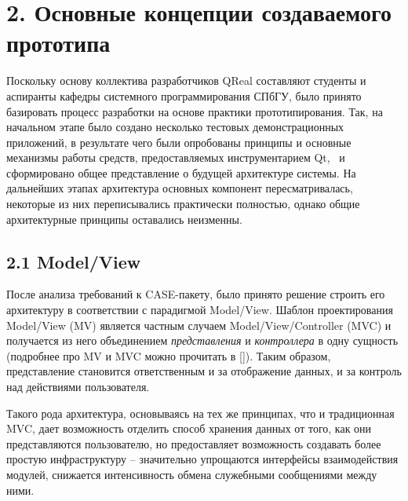 \documentclass[a4paper]{article}
\begin{document}
\bigskip

\section{2. Основные концепции создаваемого прототипа}
{
Поскольку основу коллектива разработчиков
\foreignlanguage{english}{QReal} составляют студенты и аспиранты
кафедры системного программирования СПбГУ, было принято базировать
процесс разработки на основе практики прототипирования. Так, на
начальном этапе было создано несколько тестовых демонстрационных
приложений, в результате чего были опробованы принципы и основные
механизмы работы средств, предоставляемых инструментарием Qt, \ и
сформировано общее представление о будущей архитектуре системы. На
дальнейших этапах архитектура основных компонент пересматривалась,
некоторые из них переписывались практически полностью, однако общие
архитектурные принципы оставались неизменны. }


\bigskip

\subsection[2.1 Model/View ]{ 2.1 Model/View }
{
После анализа требований к \foreignlanguage{english}{CASE}{}-пакету,
было принято решение строить его архитектуру в соответствии с
парадигмой
\foreignlanguage{english}{Model}/\foreignlanguage{english}{View}.
Шаблон проектирования
\foreignlanguage{english}{Model}/\foreignlanguage{english}{View}
(\foreignlanguage{english}{MV}) является частным случаем
\foreignlanguage{english}{Model}/\foreignlanguage{english}{View}/\foreignlanguage{english}{Controller}
(\foreignlanguage{english}{MVC}) и получается из него объединением
\textit{представления} и \textit{контроллера} в одну сущность
(подробнее про \foreignlanguage{english}{MV} и
\foreignlanguage{english}{MVC} можно прочитать в []). Таким образом,
представление становится ответственным и за отображение данных, и за
контроль над действиями пользователя.}

{
Такого рода архитектура, основываясь на тех же принципах, что и
традиционная MVC, дает возможность отделить способ хранения данных от
того, как они представляются пользователю, но предоставляет возможность
создавать более простую инфраструктуру – значительно упрощаются
интерфейсы взаимодействия модулей, снижается интенсивность обмена
служебными сообщениями между ними.}
\end{document}
